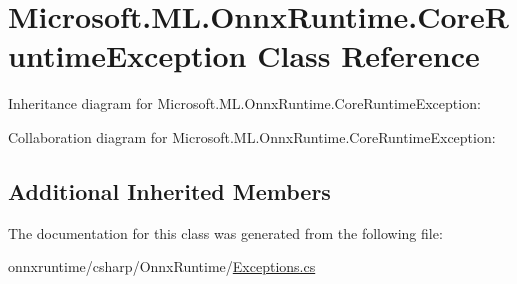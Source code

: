\hypertarget{classMicrosoft_1_1ML_1_1OnnxRuntime_1_1CoreRuntimeException}{}\section{Microsoft.\+M\+L.\+Onnx\+Runtime.\+Core\+Runtime\+Exception Class Reference}
\label{classMicrosoft_1_1ML_1_1OnnxRuntime_1_1CoreRuntimeException}


Inheritance diagram for Microsoft.\+M\+L.\+Onnx\+Runtime.\+Core\+Runtime\+Exception\+:


Collaboration diagram for Microsoft.\+M\+L.\+Onnx\+Runtime.\+Core\+Runtime\+Exception\+:
\subsection*{Additional Inherited Members}


The documentation for this class was generated from the following file\+:\begin{DoxyCompactItemize}
\item 
onnxruntime/csharp/\+Onnx\+Runtime/\mbox{\hyperlink{OnnxRuntime_2Exceptions_8cs}{Exceptions.\+cs}}\end{DoxyCompactItemize}
